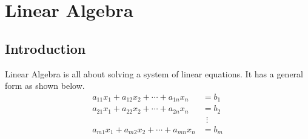 \chapter{Linear Algebra}
\section{Introduction}
Linear Algebra is all about solving a system of linear equations. It has a general form as shown below.
	\begin{align*}
	a_{11} x_1 + a_{12} x_2  + \cdots + a_{1n} x_n  &= b_1 \\
	a_{21} x_1 + a_{22} x_2  + \cdots + a_{2n} x_n  &= b_2 \\
	& \ \ \vdots\\
	a_{m1} x_1 + a_{m2} x_2  + \cdots + a_{mn} x_n  &= b_ m
	\end{align*}
	
